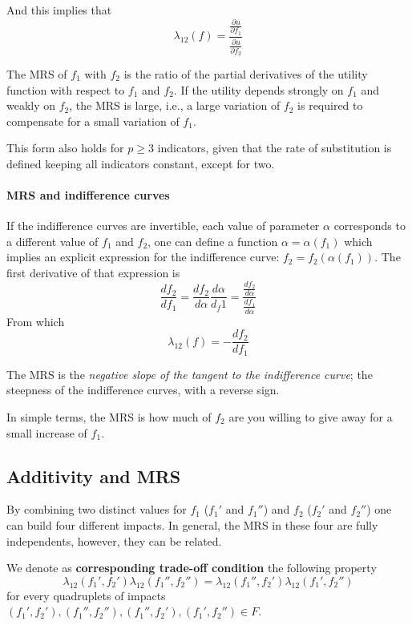 And this implies that
$$ \lambda_{12} (f) = \frac{\frac{\partial u}{\partial f_1}}{\frac{\partial u}{\partial f_2}} $$

The MRS of $f_1$ with $f_2$ is the ratio of the partial derivatives of the utility function with respect to $f_1$ and $f_2$. If the utility depends strongly on $f_1$ and weakly on $f_2$, the MRS is large, i.e., a large variation of $f_2$ is required to compensate for a small variation of $f_1$.

This form also holds for $p \geq 3$ indicators, given that the rate of substitution is defined keeping all indicators constant, except for two.

\paragraph{MRS and indifference curves} If the indifference curves are invertible, each value of parameter $\alpha$ corresponds to a different value of $f_1$ and $f_2$, one can define  a function $\alpha = \alpha (f_1)$ which implies an explicit expression for the indifference curve: $f_2 = f_2 (\alpha (f_1))$. The first derivative of that expression is
$$ \frac{df_2}{df_1} = \frac{df_2}{d\alpha} \frac{d \alpha}{d_f1}  = \frac{\frac{df_2}{d\alpha}}{\frac{df_1}{d \alpha}} $$
From which
$$ \lambda_{12} (f) = - \frac{d f_2}{d f_1} $$

The MRS is the \textit{negative slope of the tangent to the indifference curve}; the steepness of the indifference curves, with a reverse sign.

In simple terms, the MRS is how much of $f_2$ are you willing to give away for a small increase of $f_1$.

\subsection{Additivity and MRS}
\label{subsec:additivityandMRS}

By combining two distinct values for $f_1$ ($f_1'$ and $f_1''$) and $f_2$ ($f_2'$ and $f_2''$) one can build four different impacts. In general, the  MRS in these four are fully independents, however, they can be related. \\

\begin{definition}
	We denote as \textbf{corresponding trade-off condition} the following property
	$$ \lambda_{12} (f_1', f_2') \lambda_{12} (f_1'', f_2'') = \lambda_{12} (f_1'', f_2') \lambda_{12} (f_1', f_2'') $$
	for every quadruplets of impacts $(f_1', f_2'), (f_1'', f_2''), (f_1'', f_2'),  (f_1', f_2'') \in F$.
\end{definition}

